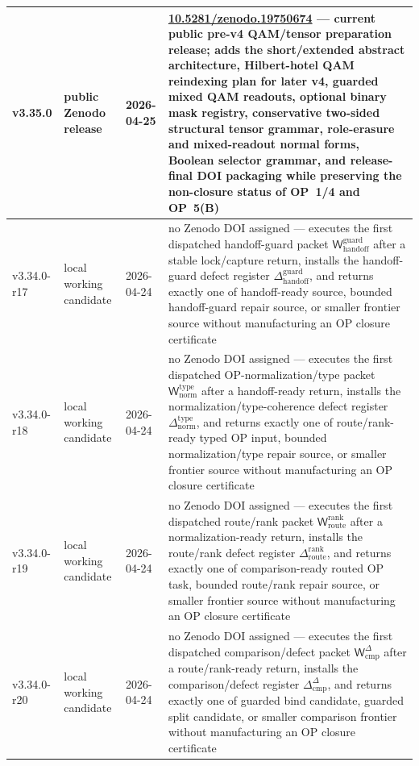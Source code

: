 {\begin{longtable}{|p{}|p{}|p{}|p{}|}
\hline
v3.35.0 & public Zenodo release & 2026-04-25 & \href{https://doi.org/10.5281/zenodo.19750674}{10.5281/zenodo.19750674} --- current public pre-v4 QAM/tensor preparation release; adds the short/extended abstract architecture, Hilbert-hotel QAM reindexing plan for later v4, guarded mixed QAM readouts, optional binary mask registry, conservative two-sided structural tensor grammar, role-erasure and mixed-readout normal forms, Boolean selector grammar, and release-final DOI packaging while preserving the non-closure status of OP~1/4 and OP~5(B) \\
\hline
v3.34.0-r17 & local working candidate & 2026-04-24 & no Zenodo DOI assigned --- executes the first dispatched handoff-guard packet \(\mathsf W_{\mathrm{handoff}}^{\mathrm{guard}}\) after a stable lock/capture return, installs the handoff-guard defect register \(\Delta_{\mathrm{handoff}}^{\mathrm{guard}}\), and returns exactly one of handoff-ready source, bounded handoff-guard repair source, or smaller frontier source without manufacturing an OP closure certificate \\
v3.34.0-r18 & local working candidate & 2026-04-24 & no Zenodo DOI assigned --- executes the first dispatched OP-normalization/type packet \(\mathsf W_{\mathrm{norm}}^{\mathrm{type}}\) after a handoff-ready return, installs the normalization/type-coherence defect register \(\Delta_{\mathrm{norm}}^{\mathrm{type}}\), and returns exactly one of route/rank-ready typed OP input, bounded normalization/type repair source, or smaller frontier source without manufacturing an OP closure certificate \\
v3.34.0-r19 & local working candidate & 2026-04-24 & no Zenodo DOI assigned --- executes the first dispatched route/rank packet \(\mathsf W_{\mathrm{route}}^{\mathrm{rank}}\) after a normalization-ready return, installs the route/rank defect register \(\Delta_{\mathrm{route}}^{\mathrm{rank}}\), and returns exactly one of comparison-ready routed OP task, bounded route/rank repair source, or smaller frontier source without manufacturing an OP closure certificate \\
v3.34.0-r20 & local working candidate & 2026-04-24 & no Zenodo DOI assigned --- executes the first dispatched comparison/defect packet \(\mathsf W_{\mathrm{cmp}}^{\Delta}\) after a route/rank-ready return, installs the comparison/defect register \(\Delta_{\mathrm{cmp}}^{\Delta}\), and returns exactly one of guarded bind candidate, guarded split candidate, or smaller comparison frontier without manufacturing an OP closure certificate \\

\end{longtable}}

